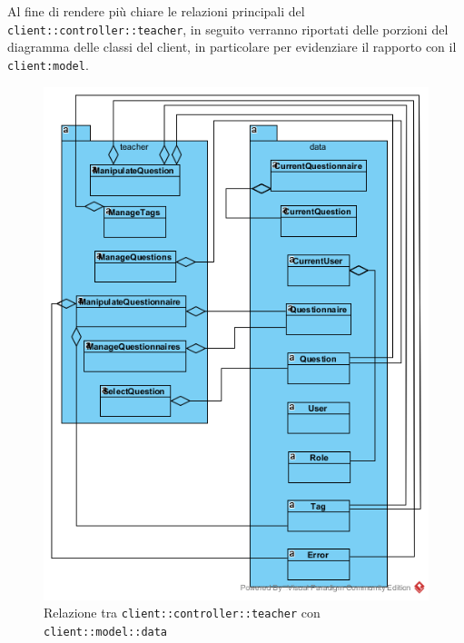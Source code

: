 Al fine di rendere più chiare le relazioni principali del  \texttt{client::controller::teacher}, in seguito verranno riportati delle porzioni del diagramma delle classi del client, in particolare per evidenziare il rapporto con il  \texttt{client:model}.

\begin{center}
	\begin{figure}[H]
		\centering \includegraphics[scale=4, max width=\textwidth, max height=\myheight]{../img/diagrammiClassi/client/controller/controllerTeacher_modelData.png}
		\caption{Relazione tra \texttt{client::controller::teacher} con \texttt{client::model::data}}
	\end{figure}
\end{center}

